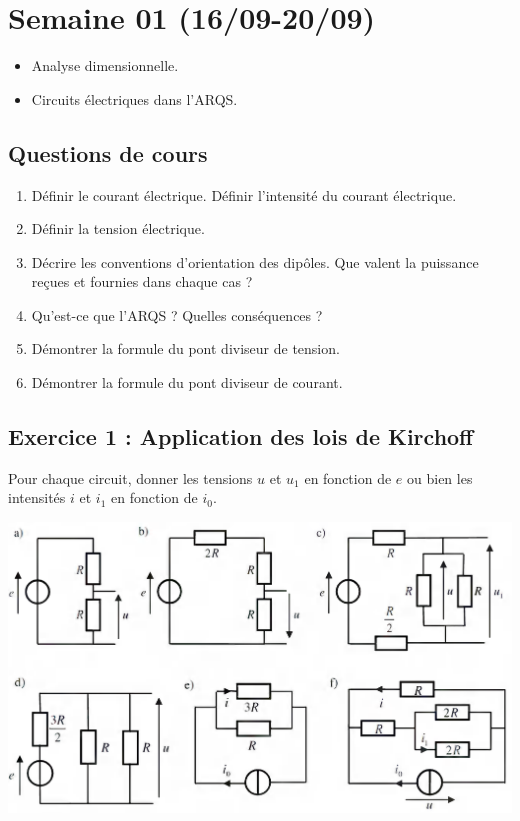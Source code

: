 \section{Semaine 01 (16/09-20/09) }


\begin{itemize}
	\item Analyse dimensionnelle.
	\item Circuits électriques dans l'ARQS.
\end{itemize}


\subsection{Questions de cours}

\begin{enumerate}
	\item Définir le courant électrique. Définir l'intensité du courant électrique.
	\item Définir la tension électrique.
	\item Décrire les conventions d'orientation des dipôles. Que valent la puissance reçues et fournies dans chaque cas ?
	\item Qu'est-ce que l'ARQS ? Quelles conséquences ?
	\item Démontrer la formule du pont diviseur de tension.
	\item Démontrer la formule du pont diviseur de courant.
\end{enumerate}

\subsection{Exercice 1 : Application des lois de Kirchoff}

Pour chaque circuit, donner les tensions $u$ et $u_1$ en fonction de $e$ ou bien les intensités $i$ et $i_1$ en fonction de $i_0$.

\includegraphics[width=\textwidth]{Images/exercicesKirchoff.png}

